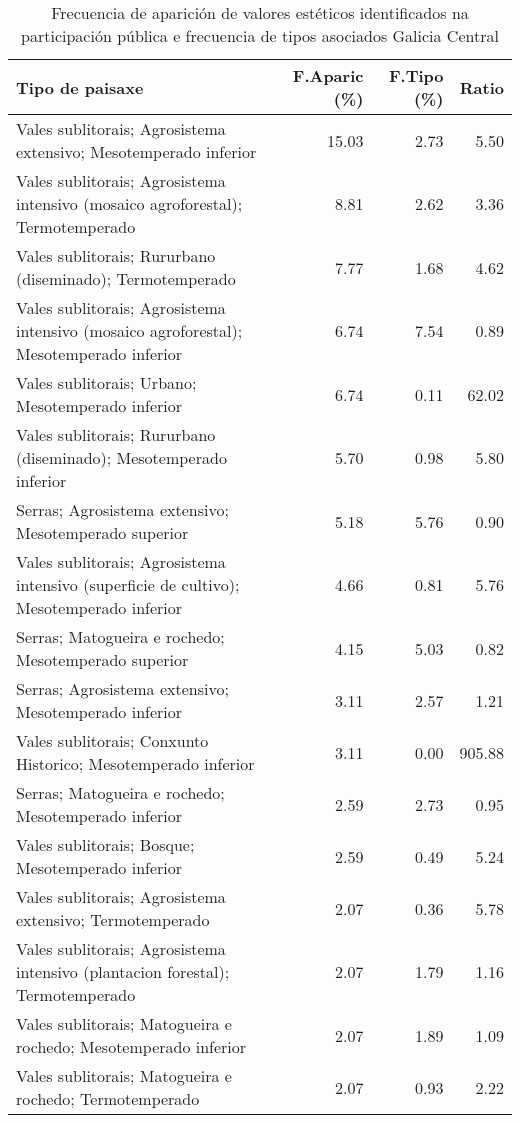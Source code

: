 \begin{table}[p]
\centering
\caption{Frecuencia de aparición de valores estéticos identificados na participación pública e frecuencia de tipos asociados Galicia Central} 
\label{vsixotest7}
\begin{tabular}{lrrr}
  \hline
Tipo de paisaxe & F.Aparic (\%) & F.Tipo (\%) & Ratio \\ 
  \hline
Vales sublitorais; Agrosistema extensivo; Mesotemperado inferior & 15.03 & 2.73 & 5.50 \\ 
  Vales sublitorais; Agrosistema intensivo (mosaico agroforestal); Termotemperado & 8.81 & 2.62 & 3.36 \\ 
  Vales sublitorais; Rururbano (diseminado); Termotemperado & 7.77 & 1.68 & 4.62 \\ 
  Vales sublitorais; Agrosistema intensivo (mosaico agroforestal); Mesotemperado inferior & 6.74 & 7.54 & 0.89 \\ 
  Vales sublitorais; Urbano; Mesotemperado inferior & 6.74 & 0.11 & 62.02 \\ 
  Vales sublitorais; Rururbano (diseminado); Mesotemperado inferior & 5.70 & 0.98 & 5.80 \\ 
  Serras; Agrosistema extensivo; Mesotemperado superior & 5.18 & 5.76 & 0.90 \\ 
  Vales sublitorais; Agrosistema intensivo (superficie de cultivo); Mesotemperado inferior & 4.66 & 0.81 & 5.76 \\ 
  Serras; Matogueira e rochedo; Mesotemperado superior & 4.15 & 5.03 & 0.82 \\ 
  Serras; Agrosistema extensivo; Mesotemperado inferior & 3.11 & 2.57 & 1.21 \\ 
  Vales sublitorais; Conxunto Historico; Mesotemperado inferior & 3.11 & 0.00 & 905.88 \\ 
  Serras; Matogueira e rochedo; Mesotemperado inferior & 2.59 & 2.73 & 0.95 \\ 
  Vales sublitorais; Bosque; Mesotemperado inferior & 2.59 & 0.49 & 5.24 \\ 
  Vales sublitorais; Agrosistema extensivo; Termotemperado & 2.07 & 0.36 & 5.78 \\ 
  Vales sublitorais; Agrosistema intensivo (plantacion forestal); Termotemperado & 2.07 & 1.79 & 1.16 \\ 
  Vales sublitorais; Matogueira e rochedo; Mesotemperado inferior & 2.07 & 1.89 & 1.09 \\ 
  Vales sublitorais; Matogueira e rochedo; Termotemperado & 2.07 & 0.93 & 2.22 \\ 

\end{tabular}
\end{table}
